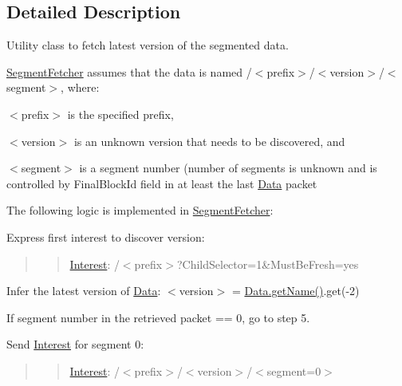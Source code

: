 \subsection{Detailed Description}
Utility class to fetch latest version of the segmented data. 

\hyperlink{classndn_1_1util_1_1SegmentFetcher}{Segment\+Fetcher} assumes that the data is named /$<$prefix$>$/$<$version$>$/$<$segment$>$, where\+:
\begin{DoxyItemize}
\item $<$prefix$>$ is the specified prefix,
\item $<$version$>$ is an unknown version that needs to be discovered, and
\item $<$segment$>$ is a segment number (number of segments is unknown and is controlled by {\ttfamily Final\+Block\+Id} field in at least the last \hyperlink{classndn_1_1Data}{Data} packet
\end{DoxyItemize}

The following logic is implemented in \hyperlink{classndn_1_1util_1_1SegmentFetcher}{Segment\+Fetcher}\+:


\begin{DoxyEnumerate}
\item Express first interest to discover version\+:
\end{DoxyEnumerate}

\begin{quote}
\begin{quote}
\hyperlink{classndn_1_1Interest}{Interest}\+: /$<$prefix$>$?Child\+Selector=1\&Must\+Be\+Fresh=yes \end{quote}
\end{quote}



\begin{DoxyEnumerate}
\item Infer the latest version of \hyperlink{classndn_1_1Data}{Data}\+: $<$version$>$ = \hyperlink{classndn_1_1Data_a14ed396d06bf43b86e4b0a67a4866303}{Data.\+get\+Name()}.get(-\/2)
\item If segment number in the retrieved packet == 0, go to step 5.
\item Send \hyperlink{classndn_1_1Interest}{Interest} for segment 0\+:
\end{DoxyEnumerate}

\begin{quote}
\begin{quote}
\hyperlink{classndn_1_1Interest}{Interest}\+: /$<$prefix$>$/$<$version$>$/$<$segment=0$>$ \end{quote}
\end{quote}



